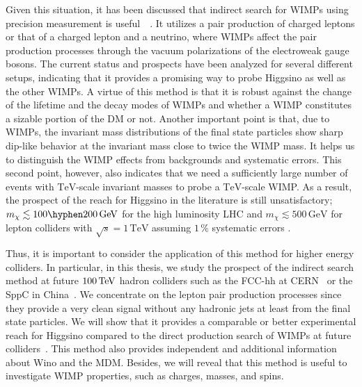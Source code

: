\documentclass[12pt,twoside,book]{article}
\begin{document}
Given this situation, it has been discussed that indirect search for WIMPs using precision measurement is useful~~\cite{Alves:2014cda, Gross:2016ioi, Farina:2016rws,Harigaya:2015yaa, Matsumoto:2017vfu, DiLuzio:2018jwd, Matsumoto:2018ioi}.
It utilizes a pair production of charged leptons or that of a charged lepton and a neutrino, where WIMPs affect the pair production processes through the vacuum polarizations of the electroweak gauge bosons.
The current status and prospects have been analyzed for several different setups, indicating that it provides a promising way to probe Higgsino as well as the other WIMPs.
A virtue of this method is that it is robust against the change of the lifetime and the decay modes of WIMPs and whether a WIMP constitutes a sizable portion of the DM or not.
Another important point is that, due to WIMPs, the invariant mass distributions of the final state particles show sharp dip-like behavior at the invariant mass close to twice the WIMP mass.
It helps us to distinguish the WIMP effects from backgrounds and systematic errors.
This second point, however, also indicates that we need a sufficiently large number of events with $\mathrm{TeV}$-scale invariant masses to probe a $\mathrm{TeV}$-scale WIMP.
As a result, the prospect of the reach for Higgsino in the literature is still unsatisfactory; $m_\chi \lesssim 100 \hyphen 200\,\mathrm{GeV}$ for the high luminosity LHC \cite{Matsumoto:2017vfu,  Matsumoto:2018ioi} and $m_\chi \lesssim 500\,\mathrm{GeV}$ for lepton colliders with $\sqrt{s}=1\,\mathrm{TeV}$ assuming $1\,\%$ systematic errors \cite{Harigaya:2015yaa}.

Thus, it is important to consider the application of this method for higher energy colliders.
In particular, in this thesis, we study the prospect of the indirect search method at future $100\,{\rm TeV}$ hadron colliders such as the FCC-hh at CERN~\cite{Mangano:2016jyj, Contino:2016spe, Golling:2016gvc} or the SppC in China~\cite{CEPC-SPPCStudyGroup:2015csa, CEPC-SPPCStudyGroup:2015esa}.
We concentrate on the lepton pair production processes since they provide a very clean signal without any hadronic jets at least from the final state particles.
We will show that it provides a comparable or better experimental reach for Higgsino compared to the direct production search of WIMPs at future colliders~\cite{Low:2014cba, Cirelli:2014dsa, Han:2018wus, Mahbubani:2017gjh}.
This method also provides independent and additional information about Wino and the MDM.
Besides, we will reveal that this method is useful to investigate WIMP properties, such as charges, masses, and spins.
\end{document}
